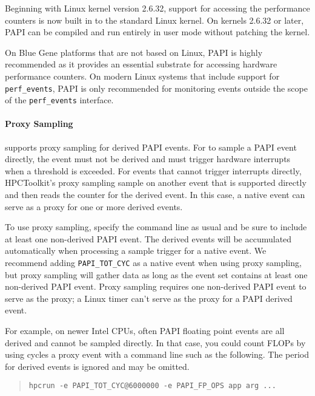 Beginning with Linux kernel version 2.6.32,
support for accessing the performance counters is now 
built in to the standard Linux kernel.  On kernels
2.6.32 or later, PAPI can be compiled and run entirely in user mode
without patching the kernel. 

On Blue Gene platforms that are not based on Linux,
PAPI is highly recommended as it provides an essential substrate for accessing
hardware performance counters. On modern Linux systems that include support
for \verb|perf_events|, PAPI is only recommended for monitoring 
events outside the scope of the \verb|perf_events| interface. 

\paragraph{Proxy Sampling}

\HPCToolkit{} supports proxy sampling for derived PAPI events.
For \HPCToolkit{} to sample a PAPI event directly, the event must not be
derived and must trigger hardware interrupts when a threshold is exceeded.  
For events that cannot trigger interrupts directly, HPCToolkit's proxy sampling
sample on another event that is supported directly and then reads the 
counter for the derived event. In this case, 
a native event can serve as a proxy for one or more derived events.

To use proxy sampling, specify the \hpcrun{} command line as usual and
be sure to include at least one non-derived PAPI event.  The derived
events will be accumulated automatically when processing a sample trigger for a native event.
We recommend adding \verb|PAPI_TOT_CYC| as a native event when using proxy sampling, but
proxy sampling will gather data  as long as the event set contains at least one
non-derived PAPI event.  Proxy sampling requires one non-derived PAPI event to serve as the proxy;
a Linux timer can't serve as the proxy for a PAPI derived event.

For example, on newer Intel CPUs, often PAPI floating point events are
all derived and cannot be sampled directly.  In that case, you could
count FLOPs by using cycles a proxy event with a command line such as
the following.  The period for derived events is ignored and may be
omitted.

\begin{quote}
\begin{verbatim}
hpcrun -e PAPI_TOT_CYC@6000000 -e PAPI_FP_OPS app arg ...
\end{verbatim}
\end{quote}


